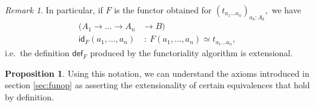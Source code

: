 \documentclass[a4paper]{article}
\theoremstyle{definition}
\newtheorem{proposition}[definition]{Proposition}
\theoremstyle{remark}
\newtheorem*{remark}{Remark}
\renewcommand{\equiv}{\simeq}
\newcommand{\nm}{\mathsf}
\newcommand{\id}{\nm{id}}
\newcommand{\fndef}[1]{\nm{def}_{#1}}
\begin{document}
\begin{remark}
  In particular, if $F$ is the functor obtained for $(t_{a_1 \ldots a_n})_{a_k : A_k},$ we
  have
  \begin{align*}
        (A_1 \to \dots \to A_n &\to   B)\\
    \id_F(a_1,\ldots,a_n)      &\ :\  F(a_1,\ldots,a_n) \equiv t_{a_1 \ldots a_n},
  \end{align*}
  i.e.\ the definition $\fndef{F}$ produced by the functoriality algorithm is extensional.
\end{remark}

\begin{proposition}
  \label{prp:extensionality-axioms}
  Using this notation, we can understand the axioms introduced in section \ref{sec:funop}
  as asserting the extensionality of certain equivalences that hold by definition.


\end{proposition}
\end{document}
